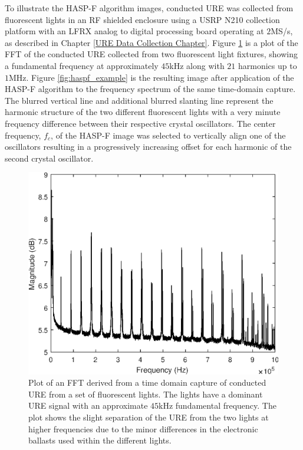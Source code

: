 To illustrate the HASP-F algorithm images, conducted URE was collected from fluorescent lights in an RF shielded enclosure using a USRP N210 collection platform with an LFRX analog to digital processing board operating at $2$MS/s, as described in Chapter \ref{URE Data Collection Chapter}.  Figure \ref{fig:hasp_fft_example} is a plot of the FFT of the conducted URE collected from two fluorescent light fixtures, showing a fundamental frequency at approximately $45$kHz along with $21$ harmonics up to $1$MHz.  Figure \ref{fig:haspf_example} is the resulting image after application of the HASP-F algorithm to the frequency spectrum of the same time-domain capture.  The blurred vertical line and additional blurred slanting line represent the harmonic structure of the two different fluorescent lights with a very minute frequency difference between their respective crystal oscillators.  The center frequency, $f_c$, of the HASP-F image was selected to vertically align one of the oscillators resulting in a progressively increasing offset for each harmonic of the second crystal oscillator.  

\begin{figure}[tp]
	\includegraphics[width=\textwidth]{./dasp_algorithm_results/hasp_fft_filenum_9601.eps}
	\centering
	\caption{Plot of an FFT derived from a time domain capture of conducted URE from a set of fluorescent lights.  The lights have a dominant URE signal with an approximate $45$kHz fundamental frequency.  The plot shows the slight separation of the URE from the two lights at higher frequencies due to the minor differences in the electronic ballasts used within the different lights.}
	\label{fig:hasp_fft_example}
\end{figure}

